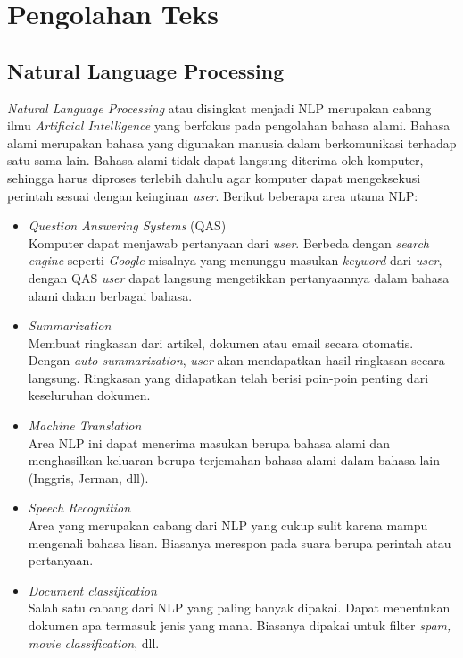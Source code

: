 \section{Pengolahan Teks}
\label{sec:pengolahan_teks}

\subsection{Natural Language Processing\cite{NLA:2003}}
\label{sec:nlp}

\textit{Natural Language Processing} atau disingkat menjadi NLP merupakan cabang ilmu \textit{Artificial Intelligence} yang berfokus pada pengolahan bahasa alami. Bahasa alami merupakan bahasa yang digunakan manusia dalam berkomunikasi terhadap satu sama lain. Bahasa alami tidak dapat langsung diterima oleh komputer, sehingga harus diproses terlebih dahulu agar komputer dapat mengeksekusi perintah sesuai dengan keinginan \textit{user}.  Berikut beberapa area utama NLP:

\begin{itemize}
	\item \textit{Question Answering Systems} (QAS)\\
	Komputer dapat menjawab pertanyaan dari \textit{user}. Berbeda dengan \textit{search engine} seperti \textit{Google} misalnya yang menunggu masukan \textit{keyword} dari \textit{user}, dengan QAS \textit{user} dapat langsung mengetikkan pertanyaannya dalam bahasa alami dalam berbagai bahasa.
	\item \textit{Summarization}\\
	Membuat ringkasan dari artikel, dokumen atau email secara otomatis. Dengan \textit{auto-summarization}, \textit{user} akan mendapatkan hasil ringkasan secara langsung. Ringkasan yang didapatkan telah berisi poin-poin penting dari keseluruhan dokumen.
	\item \textit{Machine Translation}\\
	Area NLP ini dapat menerima masukan berupa bahasa alami dan menghasilkan keluaran berupa terjemahan bahasa alami dalam bahasa lain (Inggris, Jerman, dll).
	\item \textit{Speech Recognition}\\
	Area yang merupakan cabang dari NLP yang cukup sulit karena mampu mengenali bahasa lisan. Biasanya merespon pada suara berupa perintah atau pertanyaan.
	\item \textit{Document classification}\\
	Salah satu cabang dari NLP yang paling banyak dipakai. Dapat menentukan dokumen apa termasuk jenis yang mana. Biasanya dipakai untuk filter \textit{spam, movie classification}, dll.
\end{itemize}


